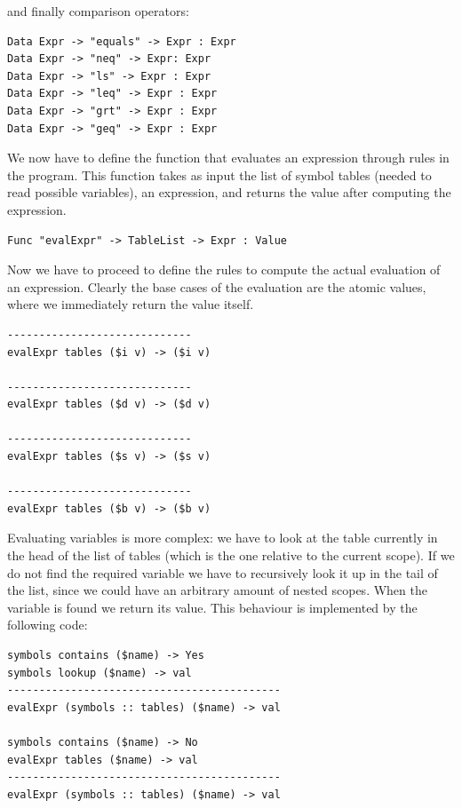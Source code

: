 \noindent
and finally comparison operators:
\begin{lstlisting}
Data Expr -> "equals" -> Expr : Expr
Data Expr -> "neq" -> Expr: Expr
Data Expr -> "ls" -> Expr : Expr
Data Expr -> "leq" -> Expr : Expr
Data Expr -> "grt" -> Expr : Expr
Data Expr -> "geq" -> Expr : Expr
\end{lstlisting}

We now have to define the function that evaluates an expression through rules in the program. This function takes as input the list of symbol tables (needed to read possible variables), an expression, and returns the value after computing the expression.

\begin{lstlisting}
Func "evalExpr" -> TableList -> Expr : Value
\end{lstlisting}

\noindent
Now we have to proceed to define the rules to compute the actual evaluation of an expression. Clearly the base cases of the evaluation are the atomic values, where we immediately return the value itself.

\begin{lstlisting}
-----------------------------
evalExpr tables ($i v) -> ($i v)

-----------------------------
evalExpr tables ($d v) -> ($d v)

-----------------------------
evalExpr tables ($s v) -> ($s v)

-----------------------------
evalExpr tables ($b v) -> ($b v)
\end{lstlisting}

Evaluating variables is more complex: we have to look at the table currently in the head of the list of tables (which is the one relative to the current scope). If we do not find the required variable we have to recursively look it up in the tail of the list, since we could have an arbitrary amount of nested scopes. When the variable is found we return its value. This behaviour is implemented by the following code:

\begin{lstlisting}
symbols contains ($name) -> Yes
symbols lookup ($name) -> val
-------------------------------------------
evalExpr (symbols :: tables) ($name) -> val

symbols contains ($name) -> No
evalExpr tables ($name) -> val
-------------------------------------------
evalExpr (symbols :: tables) ($name) -> val

\end{lstlisting}

